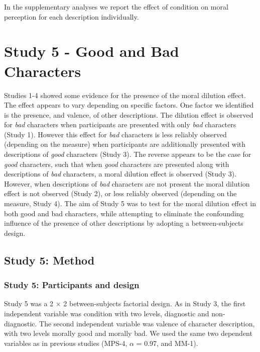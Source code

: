 \documentclass[
  english,
  man,floatsintext]{apa7}
\begin{document}
In the supplementary analyses we report the effect of condition on moral perception for each description individually.

\hypertarget{study-5---good-and-bad-characters}{%
\section{Study 5 - Good and Bad Characters}\label{study-5---good-and-bad-characters}}

Studies 1-4 showed some evidence for the presence of the moral dilution effect. The effect appears to vary depending on specific factors. One factor we identified is the presence, and valence, of other descriptions. The dilution effect is observed for \emph{bad} characters when participants are presented with only \emph{bad} characters (Study 1). However this effect for \emph{bad} characters is less reliably observed (depending on the measure) when participants are additionally presented with descriptions of \emph{good} characters (Study 3). The reverse appears to be the case for \emph{good} characters, such that when \emph{good} characters are presented along with descriptions of \emph{bad} characters, a moral dilution effect is observed (Study 3). However, when descriptions of \emph{bad} characters are not present the moral dilution effect is not observed (Study 2), or less reliably observed (depending on the measure, Study 4). The aim of Study 5 was to test for the moral dilution effect in both good and bad characters, while attempting to eliminate the confounding influence of the presence of other descriptions by adopting a between-subjects design.

\hypertarget{study-5-method}{%
\subsection{Study 5: Method}\label{study-5-method}}

\hypertarget{study-5-participants-and-design}{%
\subsubsection{Study 5: Participants and design}\label{study-5-participants-and-design}}

Study 5 was a 2 \(\times\) 2 between-subjects factorial design. As in Study 3, the first independent variable was condition with two levels, diagnostic and non-diagnostic. The second independent variable was valence of character description, with two levels morally good and morally bad. We used the same two dependent variables as in previous studies (MPS-4, \(\alpha\) = 0.97, and MM-1).
\end{document}
